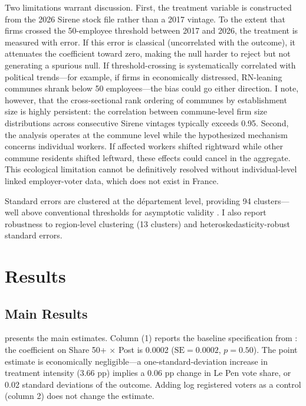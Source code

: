 \documentclass[12pt]{article}
\begin{document}
Two limitations warrant discussion. First, the treatment variable is constructed from the 2026 Sirene stock file rather than a 2017 vintage. To the extent that firms crossed the 50-employee threshold between 2017 and 2026, the treatment is measured with error. If this error is classical (uncorrelated with the outcome), it attenuates the coefficient toward zero, making the null harder to reject but not generating a spurious null. If threshold-crossing is systematically correlated with political trends---for example, if firms in economically distressed, RN-leaning communes shrank below 50 employees---the bias could go either direction. I note, however, that the cross-sectional rank ordering of communes by establishment size is highly persistent: the correlation between commune-level firm size distributions across consecutive Sirene vintages typically exceeds 0.95. Second, the analysis operates at the commune level while the hypothesized mechanism concerns individual workers. If affected workers shifted rightward while other commune residents shifted leftward, these effects could cancel in the aggregate. This ecological limitation cannot be definitively resolved without individual-level linked employer-voter data, which does not exist in France.

Standard errors are clustered at the d\'epartement level, providing 94 clusters---well above conventional thresholds for asymptotic validity \citep{rambachan2023}. I also report robustness to region-level clustering (13 clusters) and heteroskedasticity-robust standard errors.


\section{Results}

\subsection{Main Results}

 presents the main estimates. Column (1) reports the baseline specification from : the coefficient on Share 50+ $\times$ Post is 0.0002 ($\text{SE} = 0.0002$, $p = 0.50$). The point estimate is economically negligible---a one-standard-deviation increase in treatment intensity (3.66 pp) implies a 0.06 pp change in Le Pen vote share, or 0.02 standard deviations of the outcome. Adding log registered voters as a control (column 2) does not change the estimate.


\end{document}
